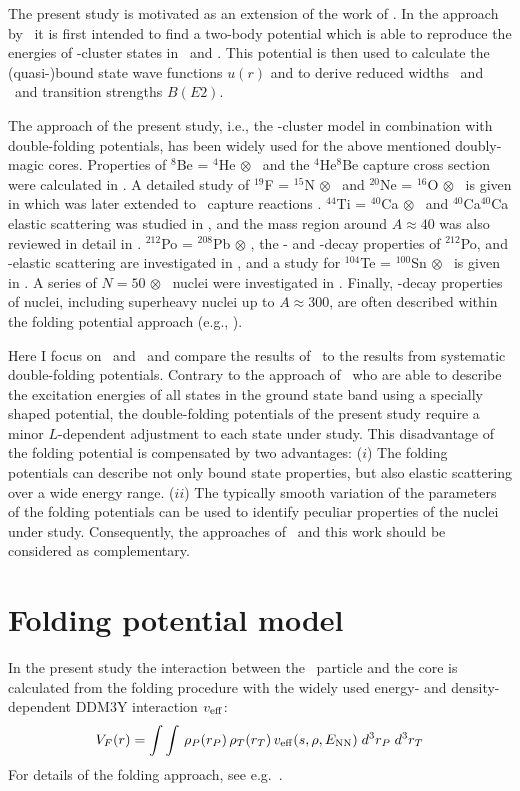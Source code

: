 The present study is motivated as an extension of the work of \SM . In the
approach by \SM\ it is first intended to find a two-body potential which is
able to reproduce the energies of \al -cluster states in \crvi\ and \criv
. This potential is then used to calculate the (quasi-)bound state wave
functions $u(r)$ and to derive reduced widths \gamal\ and \thal\ and
transition strengths $B(E2)$.

The approach of the present study, i.e., the \al -cluster model in combination
with double-folding potentials, has been widely used for the above mentioned
doubly-magic cores. Properties of $^{8}$Be = $^{4}$He $\otimes$ \al\ and the
$^{4}$He\rag $^{8}$Be capture cross section were calculated in
\cite{Mohr93}. A detailed study of $^{19}$F = $^{15}$N $\otimes$ \al\ and
$^{20}$Ne = $^{16}$O $\otimes$ \al\ is given in \cite{Abe93} which was later
extended to \rag\ capture reactions \cite{Wil02,Mohr05,Mohr06}. $^{44}$Ti =
$^{40}$Ca $\otimes$ \al\ and $^{40}$Ca\raa $^{40}$Ca elastic scattering was
studied in \cite{Atz96}, and the mass region around $A \approx 40$ was also
reviewed in detail in \cite{Sak98}.  $^{212}$Po = $^{208}$Pb $\otimes$ \al ,
the \al - and \g -decay properties of $^{212}$Po, and \al -elastic scattering
are investigated in \cite{Hoy94,Ohk95}, and a study for $^{104}$Te =
$^{100}$Sn $\otimes$ \al\ is given in \cite{Mohr07}. A series of $N = 50$
$\otimes$ \al\ nuclei were investigated in \cite{Ohk95,Ohk09,Mohr08}. Finally,
\al -decay properties of nuclei, including superheavy nuclei up to $A \approx
300$, are often described within the folding potential approach (e.g.,
\cite{Mohr00,Xu06,Mohr17}).

Here I focus on \crvi\ and \criv\ and compare the results of \SM\ to the
results from systematic double-folding potentials. Contrary to the approach of
\SM\ who are able to describe the excitation energies of all states in the
ground state band using a specially shaped potential, the double-folding
potentials of the present study require a minor $L$-dependent adjustment to
each state under study. This disadvantage of the folding potential is
compensated by two advantages: ($i$) The folding potentials can describe not
only bound state properties, but also elastic scattering over a wide energy
range. ($ii$) The typically smooth variation of the parameters of the folding
potentials can be used to identify peculiar properties of the nuclei under
study. Consequently, the approaches of \SM\ and this work should be considered
as complementary.


\section{Folding potential model}
\label{sec:fold}
%
In the present study the interaction between the \al\ particle and the core is
calculated from the folding procedure with the widely used energy- and
density-dependent DDM3Y interaction $v_{\rm{eff}}$:
%
\begin{equation}
V_F(r) = 
	\int \int \, \rho_P(r_P) \,\rho_T(r_T) \,
        v_{\rm{eff}}(s,\rho,E_{\rm{NN}}) \; d^3r_P \; d^3r_T
\label{eq:fold}
\end{equation}
%
For details of the folding approach, see e.g.\ \cite{Sat79,Kob84,Mohr13}.

